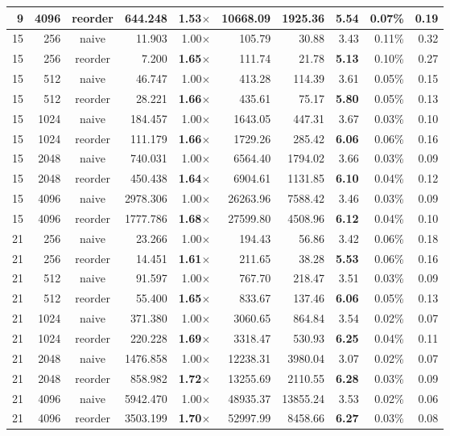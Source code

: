 \documentclass[11pt,a4paper]{article}
\begin{document}
{\begin{longtable}{rrcrrrrrrr}
9 & 4096 & reorder & 644.248 & \textbf{1.53$\times$} & 10668.09 & 1925.36 & \textbf{5.54} & 0.07\% & 0.19 \\
\midrule
15 & 256 & naive & 11.903 & 1.00$\times$ & 105.79 & 30.88 & 3.43 & 0.11\% & 0.32 \\
15 & 256 & reorder & 7.200 & \textbf{1.65$\times$} & 111.74 & 21.78 & \textbf{5.13} & 0.10\% & 0.27 \\
\midrule
15 & 512 & naive & 46.747 & 1.00$\times$ & 413.28 & 114.39 & 3.61 & 0.05\% & 0.15 \\
15 & 512 & reorder & 28.221 & \textbf{1.66$\times$} & 435.61 & 75.17 & \textbf{5.80} & 0.05\% & 0.13 \\
\midrule
15 & 1024 & naive & 184.457 & 1.00$\times$ & 1643.05 & 447.31 & 3.67 & 0.03\% & 0.10 \\
15 & 1024 & reorder & 111.179 & \textbf{1.66$\times$} & 1729.26 & 285.42 & \textbf{6.06} & 0.06\% & 0.16 \\
\midrule
15 & 2048 & naive & 740.031 & 1.00$\times$ & 6564.40 & 1794.02 & 3.66 & 0.03\% & 0.09 \\
15 & 2048 & reorder & 450.438 & \textbf{1.64$\times$} & 6904.61 & 1131.85 & \textbf{6.10} & 0.04\% & 0.12 \\
\midrule
15 & 4096 & naive & 2978.306 & 1.00$\times$ & 26263.96 & 7588.42 & 3.46 & 0.03\% & 0.09 \\
15 & 4096 & reorder & 1777.786 & \textbf{1.68$\times$} & 27599.80 & 4508.96 & \textbf{6.12} & 0.04\% & 0.10 \\
\midrule
21 & 256 & naive & 23.266 & 1.00$\times$ & 194.43 & 56.86 & 3.42 & 0.06\% & 0.18 \\
21 & 256 & reorder & 14.451 & \textbf{1.61$\times$} & 211.65 & 38.28 & \textbf{5.53} & 0.06\% & 0.16 \\
\midrule
21 & 512 & naive & 91.597 & 1.00$\times$ & 767.70 & 218.47 & 3.51 & 0.03\% & 0.09 \\
21 & 512 & reorder & 55.400 & \textbf{1.65$\times$} & 833.67 & 137.46 & \textbf{6.06} & 0.05\% & 0.13 \\
\midrule
21 & 1024 & naive & 371.380 & 1.00$\times$ & 3060.65 & 864.84 & 3.54 & 0.02\% & 0.07 \\
21 & 1024 & reorder & 220.228 & \textbf{1.69$\times$} & 3318.47 & 530.93 & \textbf{6.25} & 0.04\% & 0.11 \\
\midrule
21 & 2048 & naive & 1476.858 & 1.00$\times$ & 12238.31 & 3980.04 & 3.07 & 0.02\% & 0.07 \\
21 & 2048 & reorder & 858.982 & \textbf{1.72$\times$} & 13255.69 & 2110.55 & \textbf{6.28} & 0.03\% & 0.09 \\
\midrule
21 & 4096 & naive & 5942.470 & 1.00$\times$ & 48935.37 & 13855.24 & 3.53 & 0.02\% & 0.06 \\
21 & 4096 & reorder & 3503.199 & \textbf{1.70$\times$} & 52997.99 & 8458.66 & \textbf{6.27} & 0.03\% & 0.08 \\
\midrule
\end{longtable}
}
\end{document}
